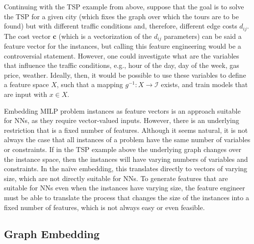 Continuing with the TSP example from above, suppose that the goal is to solve the TSP for a given city (which fixes the graph over which the tours are to be found) but with different traffic conditions and, therefore, different edge costs $d_{ij}$.
The cost vector $\bm{c}$ (which is a vectorization of the $d_{ij}$ parameters) can be said a feature vector for the instances, but calling this feature engineering would be a controversial statement.
However, one could investigate what are the variables that influence the traffic conditions, e.g., hour of the day, day of the week, gas price, weather.
Ideally, then, it would be possible to use these variables to define a feature space $X$, such that a mapping $g^{-1}: X \longrightarrow \mathcal{I}$ exists, and train models that are input with $x\in X$.

Embedding MILP problem instances as feature vectors is an approach suitable for NNs, as they require vector-valued inputs.
However, there is an underlying restriction that is a fixed number of features.
Although it seems natural, it is not always the case that all instances of a problem have the same number of variables or constraints.
If in the TSP example above the underlying graph changes over the instance space, then the instances will have varying numbers of variables and constraints.
In the naïve embedding, this translates directly to vectors of varying size, which are not directly suitable for NNs.
To generate features that are suitable for NNs even when the instances have varying size, the feature engineer must be able to translate the process that changes the size of the instances into a fixed number of features, which is not always easy or even feasible.

\subsection{Graph Embedding}\label{sec:graph-embedding}


